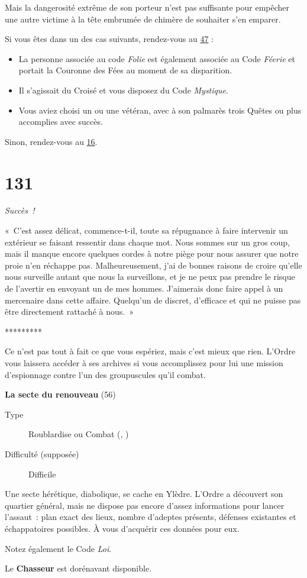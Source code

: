 \documentclass{report}
\newcommand{\gsection}[1]{
    \section{#1}
    \label{section-#1}
}
\newcommand{\glink}[1]{\hyperref[section-#1]{#1}}
\newcommand{\quest}[5]{
    \begin{mdframed}[innertopmargin=0.5cm,innerbottommargin=0.5cm,leftmargin=0.5cm,rightmargin=0.5cm]
        \begin{center}
            \textbf{#1} (#2)
        \end{center}
        \begin{description}
            \item[Type] #3
            \item[Difficulté (supposée)] #4
        \end{description}
        #5
    \end{mdframed}
}
\newcommand{\ellipse}{
    \begin{center}
        *********
    \end{center}
}
\newcommand{\success}{\emph{Succès !}}
\newcommand{\hero}[1]{\textbf{#1}}
\begin{document}
Mais la dangerosité extrême de son porteur n'est pas suffisante pour empêcher une autre victime à la tête embrumée de chimère de souhaiter s'en emparer.

Si vous êtes dans un des cas suivants, rendez-vous au \glink{47} :

\begin{itemize}
\item La personne associée au code \emph{Folie} est également associée au Code \emph{Féerie} et portait la Couronne des Fées au moment de sa disparition.
\item Il s'agissait du Croisé et vous disposez du Code \emph{Mystique}.
\item Vous aviez choisi un ou une vétéran, avec à son palmarès trois Quêtes ou plus accomplies avec succès.
\end{itemize}

Sinon, rendez-vous au \glink{16}.

\gsection{131}

\success

« C'est assez délicat, commence-t-il, toute sa répugnance à faire intervenir un extérieur se faisant ressentir dans chaque mot. Nous sommes sur un gros coup, mais il manque encore quelques cordes à notre piège pour nous assurer que notre proie n'en réchappe pas. Malheureusement, j'ai de bonnes raisons de croire qu'elle nous surveille autant que nous la surveillons, et je ne peux pas prendre le risque de l'avertir en envoyant un de mes hommes. J'aimerais donc faire appel à un mercenaire dans cette affaire. Quelqu'un de discret, d'efficace et qui ne puisse pas être directement rattaché à nous. »

\ellipse

Ce n'est pas tout à fait ce que vous espériez, mais c'est mieux que rien. L'Ordre vous laissera accéder  à ses archives si vous accomplissez pour lui une mission d'espionnage contre l'un des groupuscules qu'il combat.

\clearpage

\quest{La secte du renouveau}{56}{Roublardise ou Combat (\ankh, \cross)}{Difficile}{
Une secte hérétique, diabolique, se cache en Ylèdre. L'Ordre a découvert son quartier général, mais ne dispose pas encore d'assez informations pour lancer l'assaut : plan exact des lieux, nombre d'adeptes présents, défenses existantes et échappatoires possibles. À vous d'acquérir ces données pour eux.
}

Notez également le Code \emph{Loi}.

Le \hero{Chasseur} est dorénavant disponible.
\end{document}
